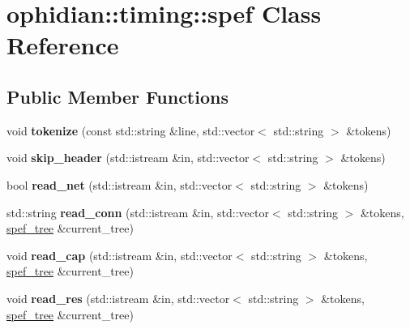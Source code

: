 \hypertarget{classophidian_1_1timing_1_1spef}{\section{ophidian\-:\-:timing\-:\-:spef Class Reference}
\label{classophidian_1_1timing_1_1spef}
}
\subsection*{Public Member Functions}
\begin{DoxyCompactItemize}
\item 
\hypertarget{classophidian_1_1timing_1_1spef_aae36d4d2a93cbd8a42451d7d287a5be0}{void {\bfseries tokenize} (const std\-::string \&line, std\-::vector$<$ std\-::string $>$ \&tokens)}\label{classophidian_1_1timing_1_1spef_aae36d4d2a93cbd8a42451d7d287a5be0}

\item 
\hypertarget{classophidian_1_1timing_1_1spef_ad1033923c2776f071c913ed376620d12}{void {\bfseries skip\-\_\-header} (std\-::istream \&in, std\-::vector$<$ std\-::string $>$ \&tokens)}\label{classophidian_1_1timing_1_1spef_ad1033923c2776f071c913ed376620d12}

\item 
\hypertarget{classophidian_1_1timing_1_1spef_a6e918642ca2bf33d6a6a2543a5224254}{bool {\bfseries read\-\_\-net} (std\-::istream \&in, std\-::vector$<$ std\-::string $>$ \&tokens)}\label{classophidian_1_1timing_1_1spef_a6e918642ca2bf33d6a6a2543a5224254}

\item 
\hypertarget{classophidian_1_1timing_1_1spef_a3d957566d5884042254f269ee63ab9fb}{std\-::string {\bfseries read\-\_\-conn} (std\-::istream \&in, std\-::vector$<$ std\-::string $>$ \&tokens, \hyperlink{structophidian_1_1timing_1_1spef__tree}{spef\-\_\-tree} \&current\-\_\-tree)}\label{classophidian_1_1timing_1_1spef_a3d957566d5884042254f269ee63ab9fb}

\item 
\hypertarget{classophidian_1_1timing_1_1spef_a97ddcac067c89a24b82755e914222157}{void {\bfseries read\-\_\-cap} (std\-::istream \&in, std\-::vector$<$ std\-::string $>$ \&tokens, \hyperlink{structophidian_1_1timing_1_1spef__tree}{spef\-\_\-tree} \&current\-\_\-tree)}\label{classophidian_1_1timing_1_1spef_a97ddcac067c89a24b82755e914222157}

\item 
\hypertarget{classophidian_1_1timing_1_1spef_aaa8f1dec7b73d1c4bc95acec70d13592}{void {\bfseries read\-\_\-res} (std\-::istream \&in, std\-::vector$<$ std\-::string $>$ \&tokens, \hyperlink{structophidian_1_1timing_1_1spef__tree}{spef\-\_\-tree} \&current\-\_\-tree)}\label{classophidian_1_1timing_1_1spef_aaa8f1dec7b73d1c4bc95acec70d13592}


\end{DoxyCompactItemize}
